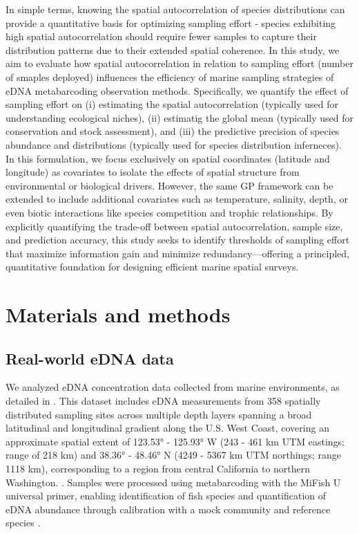 \documentclass{article}
\begin{document}
In simple terms, knowing the spatial autocorrelation of species distributions can provide a quantitative basis for optimizing sampling effort - species exhibiting high spatial autocorrelation should require fewer samples to capture their distribution patterns due to their extended spatial coherence. In this study, we aim to evaluate how spatial autocorrelation in relation to sampling effort (number of smaples deployed) influences the efficiency of marine sampling strategies of eDNA metabarcoding observation methods. Specifically, we quantify the effect of sampling effort on (i) estimating the spatial autocorrelation (typically used for understanding ecological niches), (ii) estimatig the global mean (typically used for conservation and stock assessment), and (iii) the predictive precision of species abundance and distributions (typically used for species distribution inferneces). In this formulation, we focus exclusively on spatial coordinates (latitude and longitude) as covariates to isolate the effects of spatial structure from environmental or biological drivers. However, the same GP framework can be extended to include additional covariates such as temperature, salinity, depth, or even biotic interactions like species competition and trophic relationships. By explicitly quantifying the trade-off between spatial autocorrelation, sample size, and prediction accuracy, this study seeks to identify thresholds of sampling effort that maximize information gain and minimize redundancy—offering a principled, quantitative foundation for designing efficient marine spatial surveys.
























\section{Materials and methods}

\subsection{Real-world eDNA data}
We analyzed eDNA concentration data collected from marine environments, as detailed in \citet[][in review]{guri2025}. This dataset includes eDNA measurements from 358 spatially distributed sampling sites across multiple depth layers spanning a broad latitudinal and longitudinal gradient along the U.S. West Coast, covering an approximate spatial extent of 123.53° - 125.93° W (243 - 461 km UTM eastings; range of 218 km) and 38.36° - 48.46° N (4249 - 5367 km UTM northings; range 1118 km), corresponding to a region from central California to northern Washington. . Samples were processed using metabarcoding with the MiFish U universal primer, enabling identification of fish species and quantification of eDNA abundance through calibration with a mock community and reference species \citep[][in review]{guri2025}.
\end{document}
